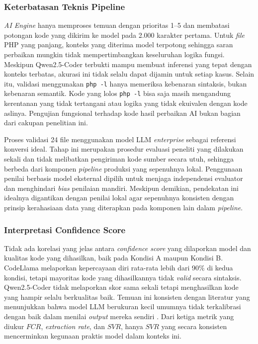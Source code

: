 \subsubsection{Keterbatasan Teknis Pipeline}
\label{sec:keterbatasan}

\textit{AI Engine} hanya memproses temuan dengan prioritas 1--5 dan membatasi potongan kode yang dikirim ke model pada 2.000 karakter pertama. Untuk \textit{file} PHP yang panjang, konteks yang diterima model terpotong sehingga saran perbaikan mungkin tidak mempertimbangkan keseluruhan logika fungsi. Meskipun Qwen2.5-Coder terbukti mampu membuat inferensi yang tepat dengan konteks terbatas, akurasi ini tidak selalu dapat dijamin untuk setiap kasus.
\newpage
Selain itu, validasi menggunakan \texttt{php -l} hanya memeriksa kebenaran sintaksis, bukan kebenaran semantik. Kode yang lolos \texttt{php -l} bisa saja masih mengandung kerentanan yang tidak tertangani atau logika yang tidak ekuivalen dengan kode aslinya. Pengujian fungsional terhadap kode hasil perbaikan AI bukan bagian dari cakupan penelitian ini.

Proses validasi 24 file menggunakan model LLM 
\textit{enterprise} sebagai referensi konversi ideal. Tahap ini 
merupakan prosedur evaluasi peneliti yang dilakukan sekali dan 
tidak melibatkan pengiriman kode sumber secara utuh, sehingga 
berbeda dari komponen \textit{pipeline} produksi yang sepenuhnya 
lokal. Penggunaan penilai berbasis model eksternal dipilih untuk 
menjaga independensi evaluator dan menghindari \textit{bias} 
penilaian mandiri. Meskipun demikian, 
pendekatan ini idealnya digantikan dengan penilai lokal agar 
sepenuhnya konsisten dengan prinsip kerahasiaan data yang 
diterapkan pada komponen lain dalam \textit{pipeline}.

\subsubsection{Interpretasi Confidence Score}

Tidak ada korelasi yang jelas antara \textit{confidence score} yang dilaporkan model dan kualitas kode yang dihasilkan, baik pada Kondisi A maupun Kondisi B. CodeLlama melaporkan kepercayaan diri rata-rata lebih dari 90\% di kedua kondisi, tetapi mayoritas kode yang dihasilkannya tidak \textit{valid} secara sintaksis. Qwen2.5-Coder tidak melaporkan skor sama sekali tetapi menghasilkan kode yang hampir selalu berkualitas baik. Temuan ini konsisten dengan literatur yang menunjukkan bahwa model LLM berukuran kecil umumnya tidak terkalibrasi dengan baik dalam menilai \textit{output} mereka sendiri \cite{akuthota2023vulnerability}\cite{li2025iris}.
Dari ketiga metrik yang diukur $FCR$, \textit{extraction rate}, 
dan $SVR$, hanya $SVR$ yang secara konsisten mencerminkan 
kegunaan praktis model dalam konteks ini.

